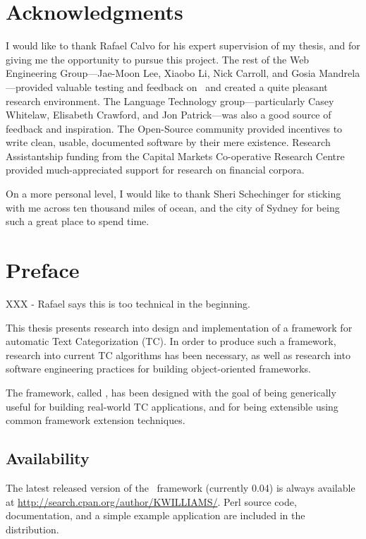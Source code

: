 \chapter{Acknowledgments}

I would like to thank Rafael Calvo for his expert supervision of my
thesis, and for giving me the opportunity to pursue this project.  The
rest of the Web Engineering Group---Jae-Moon Lee, Xiaobo Li, Nick
Carroll, and Gosia Mandrela---provided valuable testing and feedback
on \aicat\ and created a quite pleasant research environment.  The
Language Technology group---particularly Casey Whitelaw, Elisabeth
Crawford, and Jon Patrick---was also a good source of feedback and
inspiration.  The Open-Source community provided incentives to write
clean, usable, documented software by their mere existence.  Research
Assistantship funding from the Capital Markets Co-operative Research
Centre provided much-appreciated support for research on financial
corpora.

On a more personal level, I would like to thank Sheri Schechinger for sticking
with me across ten thousand miles of ocean, and the city of Sydney for
being such a great place to spend time.

\chapter{Preface}

XXX - Rafael says this is too technical in the beginning.

This thesis presents research into design and implementation of a framework
for automatic Text Categorization (TC).  In order to produce such a
framework, research into current TC algorithms has been necessary, as
well as research into software engineering practices for building
object-oriented frameworks.

The framework, called \aicat, has been designed with the goal of being
generically useful for building real-world TC applications, and for
being extensible using common framework extension techniques.

\section*{Availability}

The latest released version of the \aicat\ framework (currently 0.04)
is always available at
\url{http://search.cpan.org/author/KWILLIAMS/}.  Perl source code,
documentation, and a simple example application are included in the
distribution.

